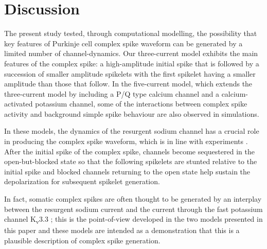 \documentclass[utf8]{frontiersSCNS} %
\newcommand{\msi}{\,\mathrm{mS cm^{-2}}}
\newcommand{\sk}{\mathrm{SK}}
\begin{document}


\section{Discussion}


The present study tested, through computational modelling, the
possibility that key features of Purkinje cell complex spike waveform
can be generated by a limited number of channel-dynamics. Our
three-current model exhibits the main features of the complex spike: a
high-amplitude initial spike that is followed by a succession of
smaller amplitude spikelets with the first spikelet having a smaller
amplitude than those that follow. In the five-current model, which
extends the three-current model by including a P/Q type calcium
channel and a calcium-activated potassium channel, some of the
interactions between complex spike activity and background simple
spike behaviour are also observed in simulations.

In these models, the dynamics of the resurgent sodium channel has a
crucial role in producing the complex spike waveform, which is in line
with experiments
\cite{RamanBean1997,NolanEtAl2003,KhaliqRaman2006}. After the initial
spike of the complex spike, channels become sequestered in the
open-but-blocked state so that the following spikelets are stunted
relative to the initial spike and blocked channels returning to the
open state help sustain the depolarization for subsequent spikelet
generation.

In fact, somatic complex spikes are often thought to be generated by
an interplay between the resurgent sodium current
\cite{RamanBean1997,RamanBean2001,KhaliqEtAl2003,KhaliqRaman2006} and
the current through the fast potassium channel K\textsubscript{v}3.3
\cite{ZaghaEtAl2008,HurlockEtAl2008,VeysEtAl2013}; this is the
point-of-view developed in the two models presented in this paper and
these models are intended as a demonstration that this is a plausible
description of complex spike generation.
\end{document}
